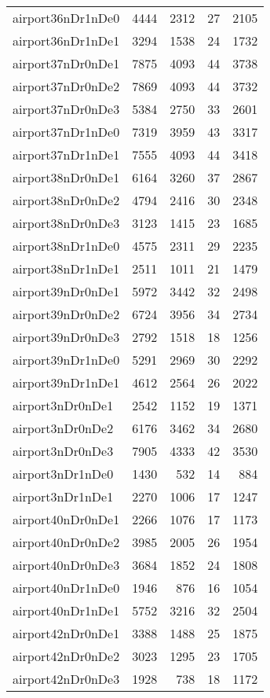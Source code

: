 \documentclass[../../../thesis.tex]{subfiles}
\begin{document}
\begin{longtable}{lrrrr}
airport36nDr1nDe0 & 4444 & 2312 & 27 & 2105 \\
airport36nDr1nDe1 & 3294 & 1538 & 24 & 1732 \\
airport37nDr0nDe1 & 7875 & 4093 & 44 & 3738 \\
airport37nDr0nDe2 & 7869 & 4093 & 44 & 3732 \\
airport37nDr0nDe3 & 5384 & 2750 & 33 & 2601 \\
airport37nDr1nDe0 & 7319 & 3959 & 43 & 3317 \\
airport37nDr1nDe1 & 7555 & 4093 & 44 & 3418 \\
airport38nDr0nDe1 & 6164 & 3260 & 37 & 2867 \\
airport38nDr0nDe2 & 4794 & 2416 & 30 & 2348 \\
airport38nDr0nDe3 & 3123 & 1415 & 23 & 1685 \\
airport38nDr1nDe0 & 4575 & 2311 & 29 & 2235 \\
airport38nDr1nDe1 & 2511 & 1011 & 21 & 1479 \\
airport39nDr0nDe1 & 5972 & 3442 & 32 & 2498 \\
airport39nDr0nDe2 & 6724 & 3956 & 34 & 2734 \\
airport39nDr0nDe3 & 2792 & 1518 & 18 & 1256 \\
airport39nDr1nDe0 & 5291 & 2969 & 30 & 2292 \\
airport39nDr1nDe1 & 4612 & 2564 & 26 & 2022 \\
airport3nDr0nDe1 & 2542 & 1152 & 19 & 1371 \\
airport3nDr0nDe2 & 6176 & 3462 & 34 & 2680 \\
airport3nDr0nDe3 & 7905 & 4333 & 42 & 3530 \\
airport3nDr1nDe0 & 1430 & 532 & 14 & 884 \\
airport3nDr1nDe1 & 2270 & 1006 & 17 & 1247 \\
airport40nDr0nDe1 & 2266 & 1076 & 17 & 1173 \\
airport40nDr0nDe2 & 3985 & 2005 & 26 & 1954 \\
airport40nDr0nDe3 & 3684 & 1852 & 24 & 1808 \\
airport40nDr1nDe0 & 1946 & 876 & 16 & 1054 \\
airport40nDr1nDe1 & 5752 & 3216 & 32 & 2504 \\
airport42nDr0nDe1 & 3388 & 1488 & 25 & 1875 \\
airport42nDr0nDe2 & 3023 & 1295 & 23 & 1705 \\
airport42nDr0nDe3 & 1928 & 738 & 18 & 1172 \\

\end{longtable}
\end{document}
